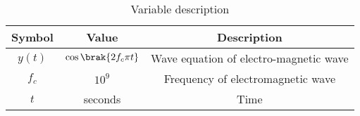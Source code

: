 \begin{table}[h]
    \centering
    \begin{tabular}{|c|c|c|}
    \hline
   Symbol&Value&Description\\ \hline
   $y(t)$&$\cos\brak{2f_c{\pi}t}$&Wave equation of electro-magnetic wave\\ \hline
   $f_c$&$10^9$&Frequency of electromagnetic wave\\ \hline
   $t$&seconds&Time\\ \hline

    \end{tabular}
    \caption{Variable description}
    \label{tab:12.8.6.1}
\end{table}
